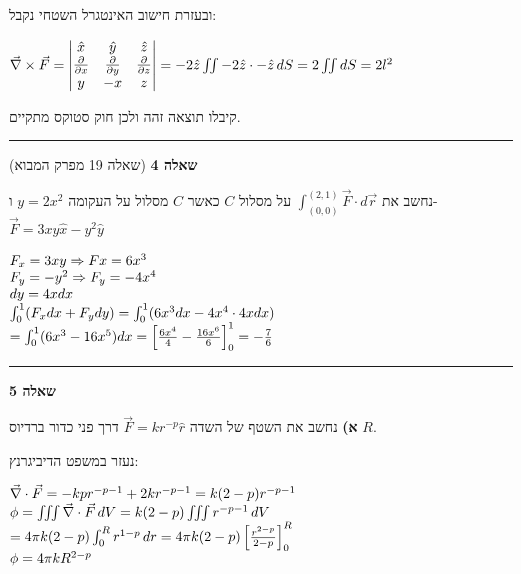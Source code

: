 \documentclass[14pt]{extarticle}
\makeatletter
\newenvironment{lefteqs}{%
    \begin{english}%
    \begin{flushleft}%
    \renewcommand{\arraystretch}{1.3}%
    $\begin{array}{@{}l@{}}%
}{%
    \end{array}$%
    \end{flushleft}%
    \end{english}%
}
\makeatother
\begin{document}
ובעזרת חישוב האינטגרל השטחי נקבל:

\begin{lefteqs}
    \vec{\nabla} \times \vec{F} = \begin{vmatrix}
    \hat{x} & \hat{y} & \hat{z} \\
    \frac{\partial}{\partial x} & \frac{\partial}{\partial y} & \frac{\partial}{\partial z} \\
    y & -x & z
    \end{vmatrix} = -2\hat{z}
    \iint -2\hat{z} \cdot -\hat{z} \, dS = 2 \iint dS = 2l^2
\end{lefteqs}

קיבלו תוצאה זהה ולכן חוק סטוקס מתקיים.

\vspace{3em}
\hrule
\vspace{2em}

\textbf{\large שאלה 4}
(שאלה 19 מפרק המבוא)

נחשב את $\int_{(0,0)}^{(2,1)} \vec{F} \cdot d\vec{r}$ על מסלול $C$ כאשר $C$ מסלול על העקומה $y=2x^2$ ו- $\vec{F} = 3xy\hat{x} - y^2\hat{y}$

\begin{lefteqs}
    F_x=3xy \Rightarrow Fx=6x^3 \\
    F_y = -y^2 \Rightarrow F_y = -4x^4 \\
    dy = 4xdx \\
    \int_{0}^{1} (F_x dx + F_y dy) = \int_{0}^{1} (6x^3 dx - 4x^4 \cdot 4x dx) \\
    = \int_{0}^{1} (6x^3 - 16x^5) dx = \left[ \frac{6x^4}{4} - \frac{16x^6}{6} \right]_{0}^{1} = -\frac{7}{6}
\end{lefteqs}

\vspace{3em}
\hrule
\vspace{2em}

\textbf{\large שאלה 5}

\textbf{א)}
נחשב את השטף של השדה $\vec{F} = kr^{-p} \hat{r}$ דרך פני כדור ברדיוס $R$.

נעזר במשפט הדיביגרנץ:

\begin{lefteqs}
    \vec{\nabla} \cdot \vec{F} = -kp r^{-p-1} + 2kr^{-p-1} = k(2-p)r^{-p-1} \\
    \phi = \iiint \vec{\nabla} \cdot \vec{F} \, dV = k(2-p) \iiint r^{-p-1} \, dV \\
    = 4\pi k(2-p) \int_{0}^{R} r^{1-p} \, dr = 4\pi k (2-p) \left[ \frac{r^{2-p }}{2-p} \right]_{0}^{R} \\
    \phi = 4\pi k R^{2-p}
\end{lefteqs}
\end{document}
